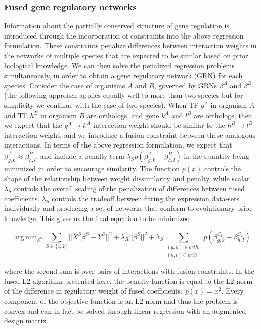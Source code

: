 \documentclass[11pt]{article}
\DeclareMathOperator*{\argmin}{arg\,min}
\begin{document}
\subsubsection{Fused gene regulatory networks}

Information about the partially conserved structure of gene regulation is introduced through the incorporation of constraints into the above regression formulation. These constraints penalize differences between interaction weights in the networks of multiple species that are expected to be similar based on prior biological knowledge. 
We can then solve the penalized regression problems simultaneously, in order to obtain a gene regulatory network (GRN) for each species. 
Consider the case of organisms $A$ and $B$, governed by GRNs $\beta^A$ and $\beta^B$ (the following approach applies equally well to more than two species but for simplicity we continue with the case of two species). 
When TF $g^A$ in organism $A$ and TF $h^B$ in organism $B$ are orthologs, and gene $k^A$ and $l^B$ are orthologs, then we expect that the $g^A \rightarrow k^A$ interaction weight should be similar to the $h^B \rightarrow l^B$ interaction weight, and we introduce a fusion constraint between these analogous interactions. 
In terms of the above regression formulation, we expect that $\beta^A_{g,k} \approx \beta^B_{h,l}$, and include a penalty term $\lambda_Sp(\beta^A_{g,k} - \beta^B_{h,l})$ in the quantity being minimized in order to encourage similarity. 
The function $p(x)$ controls the shape of the relationship between weight dissimilarity and penalty, while scalar $\lambda_S$ controls the overall scaling of the penalization of differences between fused coefficients. $\lambda_S$ controls the tradeoff between fitting the expression data-sets individually and producing a set of networks that conform to evolutionary prior knowledge. 
This gives us the final equation to be minimized: 

\begin{equation}
\argmin_{\beta^S} \displaystyle\sum_{S \in \{1, 2\}} \vert \vert X^S\beta^S - Y^S \vert \vert ^2 + \lambda_R \vert \vert \beta^S \vert \vert ^2 + \lambda_S \displaystyle \sum_{\substack{(g,h) \in orth,\\
 (k,l) \in orth}}p(\beta^{S_1}_{g,k} - \beta^{S_2}_{h,l})
\end{equation}

where the second sum is over pairs of interactions with fusion constraints. 
In the fused L2 algorithm presented here, the penalty function is equal to the L2 norm of the difference in regulatory weight of fused coefficients, $p(x)=x^2$. 
Every component of the objective function is an L2 norm and thus the problem is convex and can in fact be solved through linear regression with an augmented design matrix. 
\end{document}
